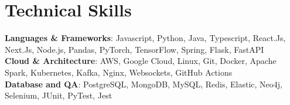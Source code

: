\section{Technical Skills}\vspace{2pt}
\begin{itemize}[leftmargin=0.15in, label={}]
    \footnotesize{\item{
    \textbf{Languages \& Frameworks}{: Javascript, Python, Java, Typescript, React.Js, Next.Js, Node.js, Pandas, PyTorch, TensorFlow, Spring, Flask, FastAPI \vspace{2px}} \\
    \textbf{Cloud \& Architecture}{: AWS, Google Cloud, Linux, Git, Docker, Apache Spark, Kubernetes, Kafka, Nginx, Websockets, GitHub Actions \vspace{2px}} \\
    \textbf{Database and QA}{: PostgreSQL, MongoDB, MySQL, Redis, Elastic, Neo4j, Selenium, JUnit, PyTest, Jest}
    }}
\end{itemize}

